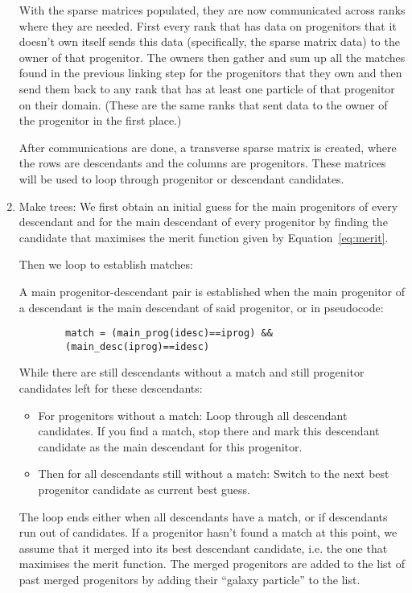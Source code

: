 \begin{enumerate}
		With the sparse matrices populated, they are now communicated across 
		ranks where they are needed. First every rank that has data on 
		progenitors that it doesn't own itself sends this data (specifically, 
		the sparse matrix data) to the owner of that progenitor.
		The owners then gather and sum up all the matches found in the previous 
		linking step for the progenitors that they own and then send them 
		back to any rank that has at least one particle of that progenitor on 
		their domain. (These are the same ranks that sent data to the owner of 
		the progenitor in the first place.)
		
		After communications are done, a transverse sparse matrix is created, 
		where the rows are descendants and the columns are progenitors.
		These matrices will be used to loop through progenitor or descendant 
		candidates.
	
	\item Make trees:
		We first obtain an initial guess for the main progenitors of every 
		descendant and for the main descendant of every progenitor by
		finding the candidate that maximises the merit function given by 
		Equation~\eqref{eq:merit}.
		
		Then we loop to establish matches:
		
		A main progenitor-descendant pair is established when the main 
		progenitor of a descendant is the main descendant of said progenitor,
		or in pseudocode:
		\begin{verbatim}
		match = (main_prog(idesc)==iprog) && 
        (main_desc(iprog)==idesc)
		\end{verbatim}
		
		While there are still descendants without a match and still 
		progenitor candidates left for these descendants:
		
		\begin{itemize}
			
			\item For progenitors without a match: Loop through all 
				descendant candidates. 
				If you find a match, stop there and mark this descendant 
				candidate as the main descendant for this progenitor.
			
			\item Then for all descendants still without a match: 
				Switch to the next best progenitor candidate as current 
				best guess.
			
		\end{itemize}
		
		The loop ends either when all descendants have a match, or 
		if descendants run out of candidates.
		If a progenitor hasn't found a match at this point, we assume 
		that it merged into its best descendant candidate, i.e. the one 
		that maximises the merit function.
	  The merged progenitors are added to the list of past merged 
	  progenitors by adding their ``galaxy particle'' to the list.
		

\end{enumerate}
